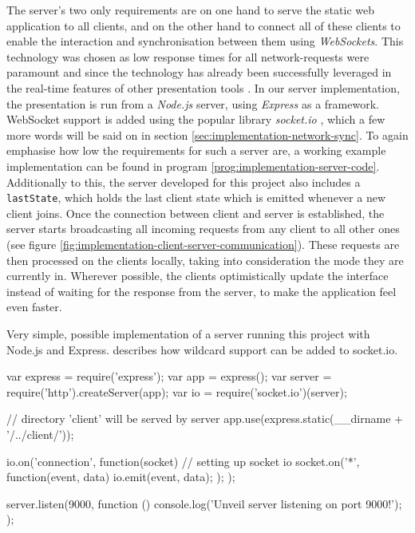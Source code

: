 The server's two only requirements are on one hand to serve the static web application to all clients, and on the other hand to connect all of these clients to enable the interaction and synchronisation between them using \emph{WebSockets}. This technology was chosen as low response times for all network-requests were paramount and since the technology has already been successfully leveraged in the real-time features of other presentation tools \cite{Inoue:RealTimeQuestionnaire, Triglianos:InteractiveWebPresentationsImpress}. In our server implementation, the presentation is run from a \emph{Node.js} \cite{nodejs} server, using \emph{Express}\cite{express} as a framework. WebSocket support is added using the popular library \emph{socket.io} \cite{socketio}, which a few more words will be said on in section \ref{sec:implementation-network-sync}.
To again emphasise how low the requirements for such a server are, a working example implementation can be found in program \ref{prog:implementation-server-code}. Additionally to this, the server developed for this project also includes a \texttt{lastState}, which holds the last client state which is emitted whenever a new client joins. Once the connection between client and server is established, the server starts broadcasting all incoming requests from any client to all other ones (see figure \ref{fig:implementation-client-server-communication}). These requests are then processed on the clients locally, taking into consideration the mode they are currently in. Wherever possible, the clients optimistically update the interface instead of waiting for the response from the server, to make the application feel even faster.

\begin{program}
\caption{Very simple, possible implementation of a server running this project with Node.js and Express. \cite{socket-io-wildcards} describes how wildcard support can be added to socket.io.}
\label{prog:implementation-server-code}
\begin{JsCode}
var express = require('express'); var app = express();
var server = require('http').createServer(app);
var io = require('socket.io')(server);

// directory 'client' will be served by server
app.use(express.static(__dirname + '/../client/'));

io.on('connection', function(socket) { // setting up socket io
  socket.on('*', function(event, data) {
    io.emit(event, data);
  });
});

server.listen(9000, function () {
  console.log('Unveil server listening on port 9000!');
});
\end{JsCode}
\end{program}

